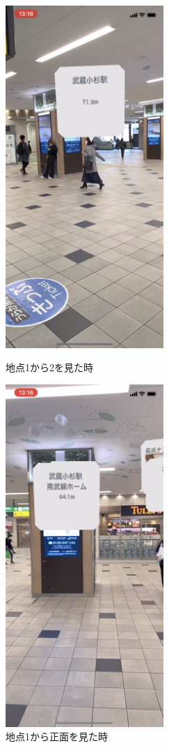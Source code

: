 \begin{figure}[h]
  \begin{minipage}{0.5\hsize}
    \centering
    \includegraphics[width=60mm]{images/musako_tokyu_ar1.png}
    \caption{地点\textcircled{\scriptsize{1}}から\textcircled{\scriptsize{2}}を見た時} \label{fig:musako_tokyu_ar1}
  \end{minipage}
  \begin{minipage}{0.5\hsize}
    \centering
    \includegraphics[width=60mm]{images/musako_tokyu_ar2.png}
    \caption{地点\textcircled{\scriptsize{1}}から正面を見た時} \label{fig:musako_tokyu_ar2}
  \end{minipage}
\end{figure}

